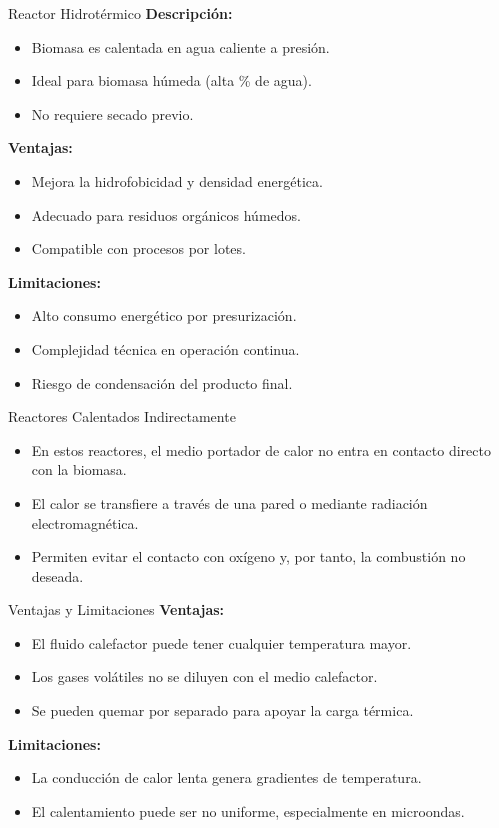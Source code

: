 \documentclass[main.tex]{subfiles}
\begin{document}
\begin{frame}{Reactor Hidrotérmico}
\footnotesize
\textbf{Descripción:}
\begin{itemize}
  \item Biomasa es calentada en agua caliente a presión.
  \item Ideal para biomasa húmeda (alta \% de agua).
  \item No requiere secado previo.
\end{itemize}

\textbf{Ventajas:}
\begin{itemize}
  \item Mejora la hidrofobicidad y densidad energética.
  \item Adecuado para residuos orgánicos húmedos.
  \item Compatible con procesos por lotes.
\end{itemize}

\textbf{Limitaciones:}
\begin{itemize}
  \item Alto consumo energético por presurización.
  \item Complejidad técnica en operación continua.
  \item Riesgo de condensación del producto final.
\end{itemize}
\end{frame}


\begin{frame}{Reactores Calentados Indirectamente}
  \begin{itemize}
    \item En estos reactores, el medio portador de calor no entra en contacto directo con la biomasa.
    \item El calor se transfiere a través de una pared o mediante radiación electromagnética.
    \item Permiten evitar el contacto con oxígeno y, por tanto, la combustión no deseada.
  \end{itemize}
\end{frame}


\begin{frame}{Ventajas y Limitaciones}
  \textbf{Ventajas:}
  \begin{itemize}
    \item El fluido calefactor puede tener cualquier temperatura mayor.
    \item Los gases volátiles no se diluyen con el medio calefactor.
    \item Se pueden quemar por separado para apoyar la carga térmica.
  \end{itemize}

  \textbf{Limitaciones:}
  \begin{itemize}
    \item La conducción de calor lenta genera gradientes de temperatura.
    \item El calentamiento puede ser no uniforme, especialmente en microondas.
  \end{itemize}
\end{frame}
\end{document}
